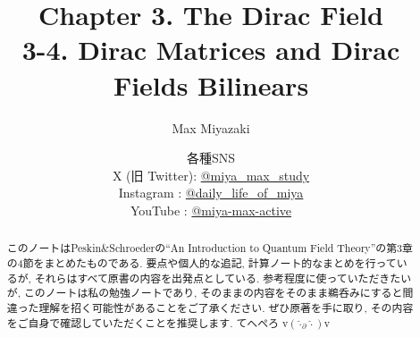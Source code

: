 \documentclass[a4paper,12pt]{article}
\title{Chapter 3. The Dirac Field\\
3-4. Dirac Matrices and Dirac Fields Bilinears}
\date{各種SNS\\
    X (旧 Twitter): \href{https://x.com/miya_max_study}{@miya\_max\_study}\\
    Instagram : \href{https://www.instagram.com/daily_life_of_miya/}{@daily\_life\_of\_miya}\\
    YouTube : \href{https://www.youtube.com/@miya-max-active}{@miya-max-active}
    }
\author{Max Miyazaki}
\begin{document}
\maketitle

\vspace{1cm}
\begin{abstract}
    このノートはPeskin\&Schroederの``An Introduction to Quantum Field Theory''の第3章の4節をまとめたものである. 要点や個人的な追記, 計算ノート的なまとめを行っているが, それらはすべて原書の内容を出発点としている. 参考程度に使っていただきたいが, このノートは私の勉強ノートであり, そのままの内容をそのまま鵜呑みにすると間違った理解を招く可能性があることをご了承ください. ぜひ原著を手に取り, その内容をご自身で確認していただくことを推奨します. てへぺろ v$({\hat{\cdot}_\partial \hat{\cdot}})$v
\end{abstract}
    
    

\newpage
\color{blue}
\end{document}
